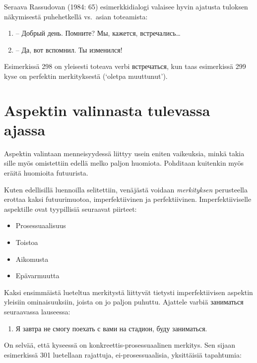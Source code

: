 \documentclass[]{scrreprt}
\providecommand{\tightlist}{%
  \setlength{\itemsep}{0pt}\setlength{\parskip}{0pt}}
\begin{document}
Seraava Rassudovan (1984: 65) esimerkkidialogi valaisee hyvin ajatusta
tuloksen näkymisestä puhehetkellä vs.~asian toteamista:

\begin{enumerate}
\def\labelenumi{(\arabic{enumi})}
\setcounter{enumi}{297}
\tightlist
\item
  -- Добрый день. Помните? Мы, кажется, встречались\ldots{}
\item
  -- Да, вот вспомнил. Ты изменился!
\end{enumerate}

Esimerkissä 298 on yleisesti toteava verbi встречаться, kun taas
esimerkissä 299 kyse on perfektin merkityksestä (`oletpa muuttunut').

\section{Aspektin valinnasta tulevassa
ajassa}\label{aspektin-valinnasta-tulevassa-ajassa}

Aspektin valintaan menneisyydessä liittyy usein eniten vaikeuksia, minkä
takia sille myös omistettiin edellä melko paljon huomiota. Pohditaan
kuitenkin myös eräitä huomioita futuurista.

Kuten edellisillä luennoilla selitettiin, venäjästä voidaan
\emph{merkityksen} perusteella erottaa kaksi futuurimuotoa,
imperfektiivinen ja perfektiivinen. Imperfektiiviselle aspektille ovat
tyypillisiä seuraavat piirteet:

\begin{itemize}
\tightlist
\item
  Prosessuaalisuus
\item
  Toistoa
\item
  Aikomusta
\item
  Epävarmuutta
\end{itemize}

Kaksi ensimmäistä lueteltua merkitystä liittyvät tietysti
imperfektiivisen aspektin yleisiin ominaisuuksiin, joista on jo paljon
puhuttu. Ajattele varbiä заниматься seuraavassa lauseessa:

\begin{enumerate}
\def\labelenumi{(\arabic{enumi})}
\setcounter{enumi}{299}
\tightlist
\item
  Я завтра не смогу поехать с вами на стадион, буду заниматься.
\end{enumerate}

On selvää, että kyseessä on konkreettis-prosessuaalinen merkitys. Sen
sijaan esimerkissä 301 luetellaan rajattuja, ei-prosessuaalisia,
yksittäisiä tapahtumia:
\end{document}
